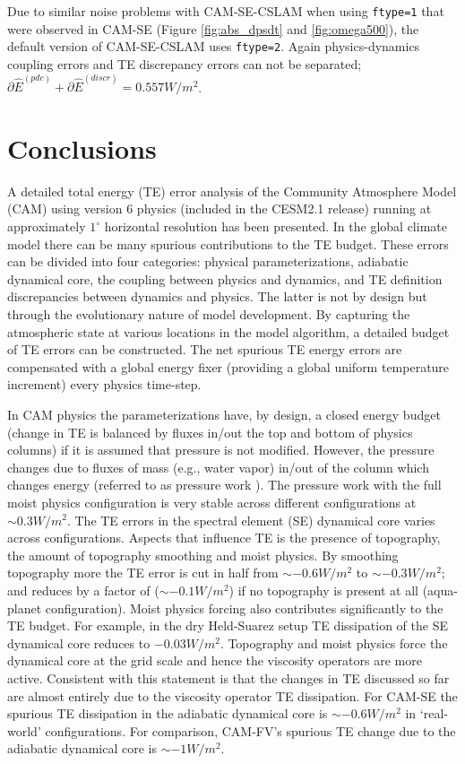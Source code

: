 \documentclass[draft,linenumbers]{agujournal}
\newcommand*{\gi}[1]{\widehat{#1}}
\begin{document}
Due to similar noise problems with CAM-SE-CSLAM when using {\tt{ftype=1}} that were observed in CAM-SE (Figure \ref{fig:abs_dpsdt} and \ref{fig:omega500}), the default version of CAM-SE-CSLAM uses {\tt{ftype=2}}. Again physics-dynamics coupling errors and TE discrepancy errors can not be separated; $\partial \gi{E}^{({pdc})}+\partial \gi{E}^{({discr})} = 0.557W/m^2$.


\section{Conclusions}\label{sec:concl}
A detailed total energy (TE) error analysis of the Community Atmosphere Model (CAM) using version 6 physics (included in the CESM2.1 release) running at approximately $1^\circ$ horizontal resolution has been presented. In the global climate model there can be many spurious contributions to the TE budget. These errors can be divided into four categories: physical parameterizations, adiabatic dynamical core, the coupling between physics and dynamics, and TE definition discrepancies between dynamics and physics. The latter is not by design but through the evolutionary nature of model development. By capturing the atmospheric state at various locations in the model algorithm, a detailed budget of TE errors can be constructed. The net spurious TE energy errors are compensated with a global energy fixer (providing a global uniform temperature increment) every physics time-step.

In CAM physics the parameterizations have, by design, a closed energy budget (change in TE is balanced by fluxes in/out the top and bottom of physics columns) if it is assumed that pressure is not modified. However, the pressure changes due to fluxes of mass (e.g., water vapor) in/out of the column which changes energy (referred to as pressure work {\color{red}{error}}). The pressure work {\color{red}{error}} with the full moist physics configuration is very stable across different configurations at $\sim 0.3W/m^2$. The TE errors in the spectral element (SE) dynamical core varies across configurations. Aspects that influence TE is the presence of topography, the amount of topography smoothing and moist physics. By smoothing topography more the TE error is cut in half from $\sim -0.6W/m^2$ to $\sim -0.3W/m^2$; and reduces by a factor of {\color{red}{six}} ($\sim-0.1W/m^2$) if no topography is present at all (aqua-planet configuration). Moist physics forcing also contributes significantly to the TE budget. For example, in the dry Held-Suarez setup TE dissipation of the SE dynamical core reduces to $-0.03W/m^2$. Topography and moist physics force the dynamical core at the grid scale and hence the viscosity operators are more active. Consistent with this statement is that the changes in TE discussed so far are almost entirely due to the viscosity operator TE dissipation. For CAM-SE the spurious TE dissipation in the adiabatic dynamical core is $\sim-0.6W/m^2$ in `real-world' configurations. For comparison, CAM-FV's spurious TE change due to the adiabatic dynamical core is $\sim-1W/m^2$. 
\end{document}
